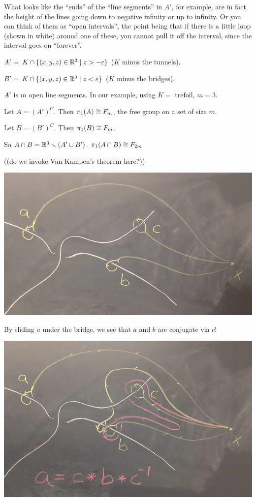 \documentclass[11pt,leqno,oneside]{amsart}
\numberwithin{thm}{section}
\newcommand{\minus}{\smallsetminus}
\renewcommand{\epsilon}{\varepsilon}
\newcommand{\fund}[1][1]{\pi_{#1}}
\begin{document}
\begin{example}
  What looks like the ``ends'' of the ``line segments'' in $A'$, for
  example, are in fact the height of the lines going down to negative
  infinity or up to infinity.  Or you can think of them as ``open
  intervals'', the point being that if there is a little loop (shown
  in white) around one of these, you cannot pull it off the interval,
  since the interval goes on ``forever''.

  $A'$ = $K \cap \{(x,y,z) \in \R^3 \mid z > -\epsilon\}$ ($K$ minus
  the tunnels).

  $B'$ = $K \cap \{(x,y,z) \in \R^3 \mid z < \epsilon\}$ ($K$ minus
  the bridges).

  $A'$ is $m$ open line segments.  In our example, using $K =$
  trefoil, $m = 3$.

  Let $A = (A')^C$.  Then $\fund(A) \isom F_m$, the free group on a
  set of size $m$.

  Let $B = (B')^C$.  Then $\fund(B) \isom F_m$.

  So $A \cap B = \R^3 \minus (A' \union B')$.
  $\fund(A \cap B) \isom F_{2m}$

  ((do we invoke Van Kampen's theorem here?))

  \includegraphics[scale=0.2]{images/mountains.jpg}

  By sliding $a$ under the bridge, we see that $a$ and $b$ are
  conjugate via $c$!

  \includegraphics[scale=0.2]{images/mountains-with-explanation.jpg}


\end{example}
\end{document}
